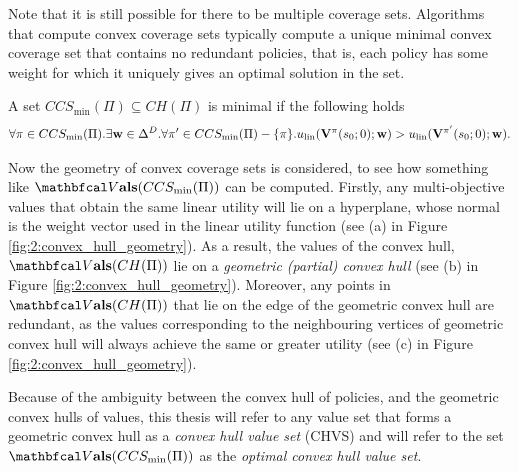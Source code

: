     Note that it is still possible for there to be multiple coverage sets. Algorithms that compute convex coverage sets typically compute a unique minimal convex coverage set that contains no redundant policies, that is, each policy has some weight for which it uniquely gives an optimal solution in the set.
    \begin{defn}
        \label{def:2:min_convex_coverage_set}
        A set $CCS_{\min}(\Pi)\subseteq CH(\Pi)$ is minimal if the following holds
        \begin{align}
         \forall \pi\in CCS_{\min}(\Pi). \exists \mathbf{w}\in\Delta^D. \forall \pi'\in CCS_{\min}(\Pi)-\{\pi\}. u_{{\textnormal{lin}}}(\mathbf{V}^{\pi}(s_0;0);\mathbf{w}) > u_{{\textnormal{lin}}}(\mathbf{V}^{\pi'}(s_0;0);\mathbf{w}).
        \end{align}
    \end{defn} 

    Now the geometry of convex coverage sets is considered, to see how something like $\valset(CCS_{\min}(\Pi))$ can be computed. Firstly, any multi-objective values that obtain the same linear utility will lie on a hyperplane, whose normal is the weight vector used in the linear utility function (see (a) in Figure \ref{fig:2:convex_hull_geometry}). As a result, the values of the convex hull, $\valset(CH(\Pi))$ lie on a \textit{geometric (partial) convex hull} (see (b) in Figure \ref{fig:2:convex_hull_geometry}). Moreover, any points in $\valset(CH(\Pi))$ that lie on the edge of the geometric convex hull are redundant, as the values corresponding to the neighbouring vertices of geometric convex hull will always achieve the same or greater utility (see (c) in Figure \ref{fig:2:convex_hull_geometry}).

    Because of the ambiguity between the convex hull of policies, and the geometric convex hulls of values, this thesis will refer to any value set that forms a geometric convex hull as a \textit{convex hull value set} (CHVS) and will refer to the set $\valset(CCS_{\min}(\Pi))$ as the \textit{optimal convex hull value set}. 

